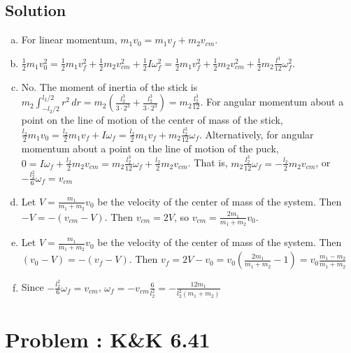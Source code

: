 \documentclass[solutions]{esg8012pset}
\renewcommand{\d}{\,d}
\begin{document}
\subsection{Solution}
  \begin{enumerate}[(a)]
    \item For linear momentum, $m_1 v_0 = m_1 v_f + m_2 v_{cm}$.
    \item $\frac{1}{2}m_1v_0^2 = \frac{1}{2} m_1 v_f^2 + \frac{1}{2}m_2 v_{cm}^2 + \frac{1}{2} I \omega_f^2 = \frac{1}{2} m_1 v_f^2 + \frac{1}{2}m_2 v_{cm}^2 + \frac{1}{2} m_2 \frac{l^3}{12} \omega_f^2$.
    \item No. The moment of inertia of the stick is $m_2\int_{-l_2/2}^{l_2/2} r^2 \d r = m_2\left(\frac{l_2^3}{3\cdot 2^3} + \frac{l_2^3}{3\cdot 2^3}\right) = m_2 \frac{l_2^3}{12}$.  For angular momentum about a point on the line of motion of the center of mass of the stick, $\frac{l_2}{2} m_1 v_0 = \frac{l_2}{2} m_1 v_f + I\omega_f = \frac{l_2}{2} m_1 v_f + m_2 \frac{l_2^3}{12}\omega_f$.  Alternatively, for angular momentum about a point on the line of motion of the puck, $0 = I\omega_f + \frac{l_2}{2} m_2 v_{cm} = m_2 \frac{l_2^3}{12}\omega_f + \frac{l_2}{2} m_2 v_{cm}$.  That is, $m_2 \frac{l_2^3}{12}\omega_f = -\frac{l_2}{2} m_2 v_{cm}$, or $-\frac{l_2^2}{6}\omega_f = v_{cm}$
    \item Let $V = \frac{m_1}{m_1 + m_2}v_0$ be the velocity of the center of mass of the system.  Then $-V = -(v_{cm} - V)$.  Then $v_{cm} = 2V$, so $v_{cm} = \frac{2m_1}{m_1 + m_2}v_0$.
    \item Let $V = \frac{m_1}{m_1 + m_2}v_0$ be the velocity of the center of mass of the system.  Then $(v_0 - V) = -(v_f - V)$.  Then $v_f = 2V-v_0 = v_0\left(\frac{2m_1}{m_1 + m_2} - 1\right) = v_0\frac{m_1 - m_2}{m_1 + m_2}$
    \item Since $-\frac{l_2^2}{6}\omega_f = v_{cm}$, $\omega_f = -v_{cm}\frac{6}{l_2^2} = -\frac{12m_1}{l_2^2(m_1 + m_2)}$
  \end{enumerate}
\section{Problem \thesection: K\&K 6.41}
\end{document}
